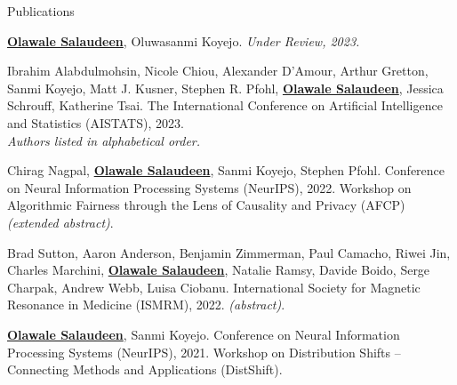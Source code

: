 \documentclass[11pt]{resume} %
\begin{document}
\begin{rSection}{Publications}
\begin{etaremune}[label={\arabic*.},topsep=0pt,itemsep=5pt,partopsep=0pt,parsep=0pt]

\item \textbf{\underline{Olawale Salaudeen}}, Oluwasanmi Koyejo.
\emph{Under Review, 2023.}

\item Ibrahim Alabdulmohsin, Nicole Chiou, Alexander D'Amour, Arthur Gretton, 
Sanmi Koyejo, Matt J. Kusner, Stephen R. Pfohl, 
\textbf{\underline{Olawale Salaudeen}}, Jessica Schrouff, Katherine Tsai. 
The International Conference on Artificial Intelligence and Statistics (AISTATS), 2023.\\ 
\emph{Authors listed in alphabetical order.}

\item Chirag Nagpal, \textbf{\underline{Olawale Salaudeen}}, Sanmi Koyejo, Stephen
Pfohl.
Conference on Neural Information Processing Systems (NeurIPS), 2022. Workshop
on Algorithmic Fairness through the Lens of Causality and Privacy (AFCP) 
\emph{(extended abstract)}.


\item Brad Sutton, Aaron Anderson, Benjamin Zimmerman, Paul Camacho, Riwei Jin, Charles Marchini,
\textbf{\underline{Olawale Salaudeen}}, Natalie Ramsy, Davide Boido, Serge
Charpak, Andrew Webb, Luisa Ciobanu. 
International Society for Magnetic Resonance in Medicine (ISMRM), 2022. \emph{(abstract)}.

\item \textbf{\underline{Olawale Salaudeen}}, Sanmi Koyejo. 
Conference on Neural Information Processing Systems (NeurIPS), 2021. Workshop on Distribution Shifts -- Connecting Methods and Applications (DistShift).
\end{etaremune}
\end{rSection}
\end{document}
